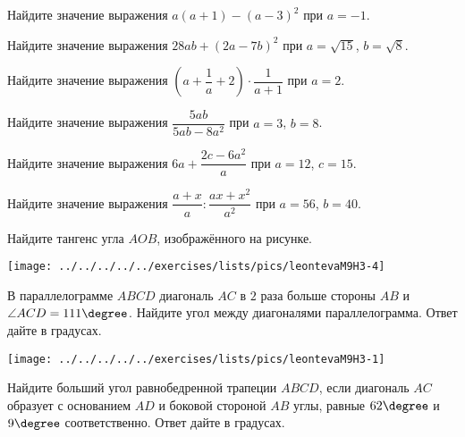 \begin{homework}[number=3]
	\begin{listofex}
		\item Найдите значение выражения \( a(a+1)-(a-3)^{2} \) при \( a=-1 \).
		\item Найдите значение выражения \( 28ab+(2a-7b)^{2} \) при \( a=\sqrt{15} \), \( b=\sqrt{8} \).
		\item Найдите значение выражения \( \left( a+\dfrac{1}{a}+2 \right)\cdot\dfrac{1}{a+1} \) при \( a=2 \).
		\item Найдите значение выражения \( \dfrac{5ab}{5ab-8a^{2}} \) при \( a=3 \), \( b=8 \).
		\item Найдите значение выражения \( 6a+\dfrac{2c-6a^{2}}{a} \) при \( a=12 \), \( c=15 \).
		\item Найдите значение выражения \( \dfrac{a+x}{a}:\dfrac{ax+x^{2}}{a^{2}} \) при \( a=56 \), \( b=40 \).
		\item 
		\begin{minipage}[t]{\bodywidth}
			Найдите тангенс угла \( AOB \), изображённого на рисунке.
		\end{minipage}
		\hspace{0.02\linewidth}
		\begin{minipage}[t]{\picwidth}
			\texttt{[image: ../../../../../exercises/lists/pics/leontevaM9H3-4]}
		\end{minipage}
		\item 
		\begin{minipage}[t]{\bodywidth}
			В параллелограмме \( ABCD \) диагональ \( AC \) в \( 2 \) раза больше стороны \( AB \) и \( \angle ACD=111 \degree \). Найдите угол между диагоналями параллелограмма. Ответ дайте в градусах.
		\end{minipage}
		\hspace{0.02\linewidth}
		\begin{minipage}[t]{\picwidth}
			\texttt{[image: ../../../../../exercises/lists/pics/leontevaM9H3-1]}
		\end{minipage}
	 	\item 
	 	\begin{minipage}[t]{\bodywidth}
	 		Найдите больший угол равнобедренной трапеции \( ABCD \), если диагональ \( AC \) образует с основанием \( AD \) и боковой стороной \( AB \) углы, равные \( 62\degree \) и \( 9\degree \) соответственно. Ответ дайте в градусах.
	 	\end{minipage}

\end{listofex}
\end{homework}
